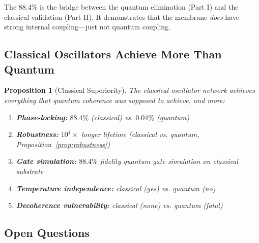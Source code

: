 \documentclass[12pt]{article}
\newtheorem{proposition}[theorem]{Proposition}
\theoremstyle{definition}
\theoremstyle{remark}
\begin{document}
The $88.4\%$ is the bridge between the quantum elimination (Part I) and the classical validation (Part II). It demonstrates that the membrane \emph{does} have strong internal coupling---just not quantum coupling.

\subsection{Classical Oscillators Achieve More Than Quantum}

\begin{proposition}[Classical Superiority]
\label{prop:superiority}
The classical oscillator network achieves everything that quantum coherence was supposed to achieve, and more:
\begin{enumerate}[label=(\roman*)]
    \item \textbf{Phase-locking:} $88.4\%$ (classical) vs. $0.04\%$ (quantum)
    \item \textbf{Robustness:} $10^4\times$ longer lifetime (classical vs. quantum, Proposition~\ref{prop:robustness})
    \item \textbf{Gate simulation:} $88.4\%$ fidelity quantum gate simulation on classical substrate
    \item \textbf{Temperature independence:} classical (yes) vs. quantum (no)
    \item \textbf{Decoherence vulnerability:} classical (none) vs. quantum (fatal)
\end{enumerate}
\end{proposition}

\subsection{Open Questions}
\end{document}
